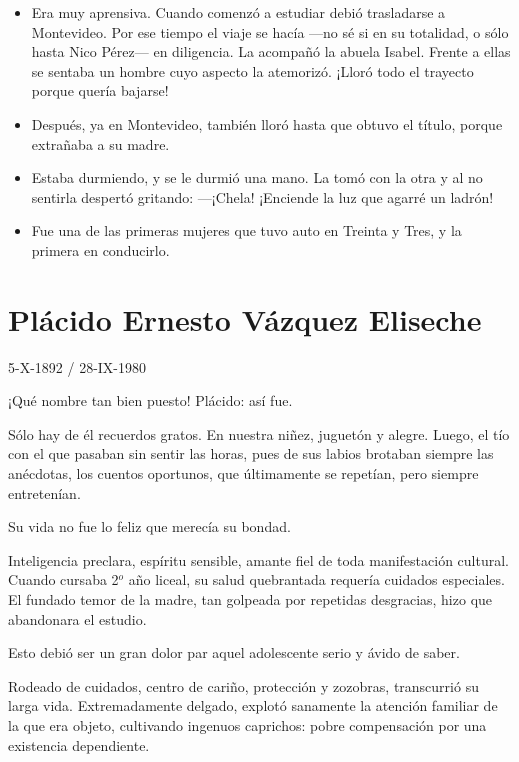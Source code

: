 \documentclass[a4paper]{article}
\begin{document}
\begin{itemize}
    \item{Era muy aprensiva. Cuando comenzó a estudiar debió trasladarse a Montevideo. Por ese tiempo el viaje se hacía ---no sé si en su totalidad, o sólo hasta Nico Pérez--- en diligencia. La acompañó la abuela Isabel. Frente a ellas se sentaba un hombre cuyo aspecto la atemorizó. ¡Lloró todo el trayecto porque quería bajarse!}
    \item{Después, ya en Montevideo, también lloró hasta que obtuvo el título, porque extrañaba a su madre.}
    \item{Estaba durmiendo, y se le durmió una mano. La tomó con la otra y al  no sentirla despertó gritando: ---¡Chela! ¡Enciende la luz que agarré un ladrón!}
    \item{Fue una de las primeras mujeres que tuvo auto en Treinta y Tres, y la primera en conducirlo.}
\end{itemize}

\section{Plácido Ernesto Vázquez Eliseche}

5-X-1892 / 28-IX-1980

\bigbreak{}

¡Qué nombre tan bien puesto! Plácido: así fue.

Sólo hay de él recuerdos gratos. En nuestra niñez, juguetón y alegre. Luego, el tío con el que pasaban sin sentir las horas, pues de sus labios brotaban siempre las anécdotas, los cuentos oportunos, que últimamente se repetían, pero siempre entretenían.

Su vida no fue lo feliz que merecía su bondad.

Inteligencia preclara, espíritu sensible, amante fiel de toda manifestación cultural. Cuando cursaba 2$^o$ año liceal, su salud quebrantada requería cuidados especiales. El fundado temor de la madre, tan golpeada por repetidas desgracias, hizo que abandonara el estudio.

Esto debió ser un gran dolor par aquel adolescente serio y ávido de saber.

Rodeado de cuidados, centro de cariño, protección y zozobras, transcurrió su larga vida. Extremadamente delgado, explotó sanamente la atención familiar de la que era objeto, cultivando ingenuos caprichos: pobre compensación por una existencia dependiente.
\end{document}
